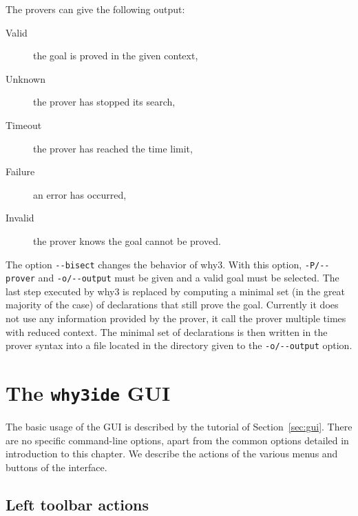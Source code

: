 
\noindent
The provers can give the following output:
\begin{description}
\item[Valid] the goal is proved in the given context,
\item[Unknown] the prover has stopped its search,
\item[Timeout] the prover has reached the time limit,
\item[Failure] an error has occurred,
\item[Invalid] the prover knows the goal cannot be proved.
\end{description}

The option \verb|--bisect| changes the behavior of why3. With this
option, \verb|-P/--prover| and \verb|-o/--output| must be given
and a valid goal must be selected. The last step executed by why3 is
replaced by computing a minimal set (in the great majority of the
case) of declarations that still prove the goal. Currently it does not
use any information provided by the prover, it call the prover
multiple times with reduced context. The minimal set of declarations is
then written in the prover syntax into a file located in the directory
given to the \verb|-o/--output| option.

\section{The \texttt{why3ide} GUI}
\label{sec:ideref}

The basic usage of the GUI is described by the tutorial of
Section~\ref{sec:gui}. There are no specific command-line options,
apart from the common options detailed in introduction to this chapter.
We describe the actions of the various menus and buttons of the interface.

\subsection{Left toolbar actions}

